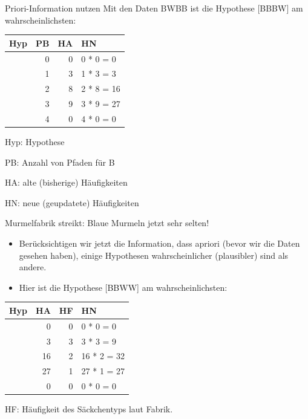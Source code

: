 \documentclass[
  ngerman,
  ignorenonframetext,
]{beamer}
\begin{document}
\begin{frame}{Priori-Information nutzen}
\protect\hypertarget{priori-information-nutzen}{}
Mit den Daten BWBB ist die Hypothese {[}BBBW{]} am wahrscheinlichsten:

\begin{tabular}[t]{l|r|r|l}
\hline
Hyp & PB & HA & HN\\
\hline
[W W W W] & 0 & 0 & 0 * 0 = 0\\
\hline
[B W W W] & 1 & 3 & 1 * 3 = 3\\
\hline
[B B W W] & 2 & 8 & 2 * 8 = 16\\
\hline
[B B B W] & 3 & 9 & 3 * 9 = 27\\
\hline
[B B B B] & 4 & 0 & 4 * 0 = 0\\
\hline
\end{tabular}

Hyp: Hypothese

PB: Anzahl von Pfaden für B

HA: alte (bisherige) Häufigkeiten

HN: neue (geupdatete) Häufigkeiten
\end{frame}

\begin{frame}{Murmelfabrik streikt: Blaue Murmeln jetzt sehr selten!}
\protect\hypertarget{murmelfabrik-streikt-blaue-murmeln-jetzt-sehr-selten}{}
\begin{itemize}
\item
  Berücksichtigen wir jetzt die Information, dass apriori (bevor wir die
  Daten gesehen haben), einige Hypothesen wahrscheinlicher (plausibler)
  sind als andere.
\item
  Hier ist die Hypothese {[}BBWW{]} am wahrscheinlichsten:
\end{itemize}

\begin{tabular}{l|r|r|l}
\hline
Hyp & HA & HF & HN\\
\hline
[W W W W] & 0 & 0 & 0 * 0 = 0\\
\hline
[B W W W] & 3 & 3 & 3 * 3 = 9\\
\hline
[B B W W] & 16 & 2 & 16 * 2 = 32\\
\hline
[B B B W] & 27 & 1 & 27 * 1 = 27\\
\hline
[B B B B] & 0 & 0 & 0 * 0 = 0\\
\hline
\end{tabular}

HF: Häufigkeit des Säckchentyps laut Fabrik.
\end{frame}
\end{document}

